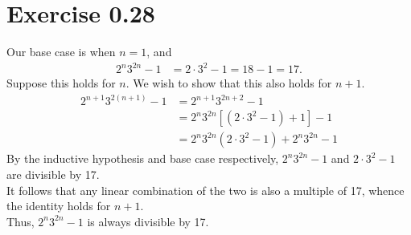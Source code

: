 \documentclass{article}
\begin{document}

\section*{Exercise 0.28}
Our base case is when \(n=1\), and \begin{align}
    2^n 3^{2n}-1 &= 2\cdot 3^2 -1 = 18-1 = 17.
\end{align}
Suppose this holds for \(n\). We wish to show that this also holds for \(n+1\).
\begin{align}
    2^{n+1}3^{2(n+1)}-1 &= 2^{n+1}3^{2n+2}-1 \\
    &= 2^n 3^{2n} [(2\cdot 3^2-1)+1]-1 \\
    &= 2^n 3^{2n}(2\cdot 3^2-1)+2^n 3^{2n} -1
\end{align}
By the inductive hypothesis and base case respectively, \(2^n 3^{2n}-1\) and \(2\cdot 3^2 -1\) are divisible by 17. \\
It follows that any linear combination of the two is also a multiple of 17, whence the identity holds for \(n+1\). \\
Thus, \(2^n 3^{2n}-1\) is always divisible by 17.
\end{document}
